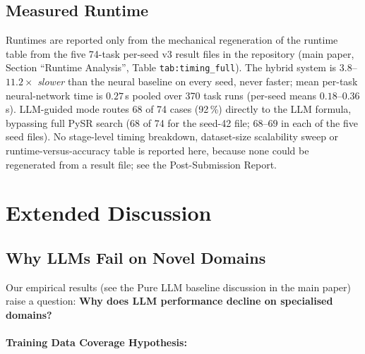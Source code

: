 \documentclass[twoside,11pt]{article}
\begin{document}
\subsection{Measured Runtime}

Runtimes are reported only from the mechanical regeneration of the runtime table from the
five 74-task per-seed v3 result files in the repository (main paper, Section ``Runtime
Analysis'', Table \texttt{tab:timing\_full}). The hybrid system is $3.8$--$11.2\times$
\emph{slower} than the neural baseline on every seed, never faster; mean per-task
neural-network time is $0.27$\,s pooled over 370 task runs (per-seed means
$0.18$--$0.36$\,s). LLM-guided mode routes 68 of 74 cases (92\,\%) directly to the LLM
formula, bypassing full PySR search (68 of 74 for the seed-42 file; $68$--$69$ in each of the
five seed files). No stage-level timing breakdown, dataset-size scalability sweep or
runtime-versus-accuracy table is reported here, because none could be regenerated from a
result file; see the Post-Submission Report.






\section{Extended Discussion}
\label{app:extended_discussion}

\subsection{Why LLMs Fail on Novel Domains}

Our empirical results (see the Pure LLM baseline discussion in the main paper) raise a question: \textbf{Why does LLM performance decline on specialised domains?}\citep{kambhampati2024llms}

\paragraph{Training Data Coverage Hypothesis:}
\end{document}

